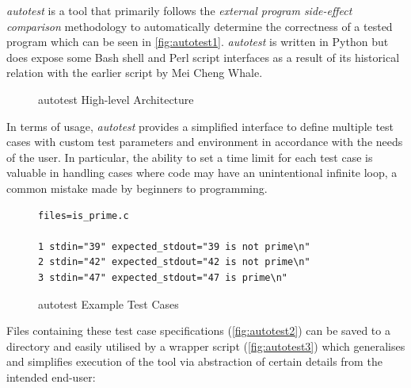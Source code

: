 \documentclass[hidelinks]{report}
\begin{document}
\textit{autotest} is a tool that primarily follows the \textit{external program side-effect comparison} methodology to automatically determine the correctness of a tested program which can be seen in \autoref{fig:autotest1}. \textit{autotest} is written in Python but does expose some Bash shell and Perl script interfaces as a result of its historical relation with the earlier script by Mei Cheng Whale.

\begin{figure}[h]
	\centering
	\caption{autotest High-level Architecture}
	\label{fig:autotest1}
\end{figure}

In terms of usage, \textit{autotest} provides a simplified interface to define multiple test cases with custom test parameters and environment in accordance with the needs of the user. In particular, the ability to set a time limit for each test case is valuable in handling cases where code may have an unintentional infinite loop, a common mistake made by beginners to programming.

\begin{figure}[h]
	\centering
	\begin{lstlisting}[linewidth=\linewidth]
files=is_prime.c
		
1 stdin="39" expected_stdout="39 is not prime\n"
2 stdin="42" expected_stdout="42 is not prime\n"
3 stdin="47" expected_stdout="47 is prime\n"
	\end{lstlisting}
	\caption{autotest Example Test Cases}
	\label{fig:autotest2}
\end{figure}

Files containing these test case specifications (\autoref{fig:autotest2}) can be saved to a directory and easily utilised by a wrapper script (\autoref{fig:autotest3}) which generalises and simplifies execution of the tool via abstraction of certain details from the intended end-user:
\end{document}
